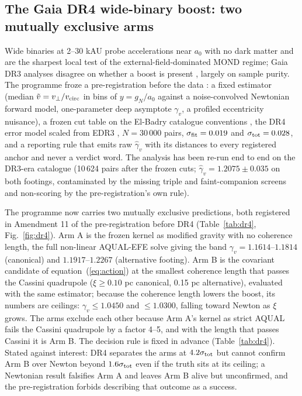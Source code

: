 \documentclass[fleqn,usenatbib]{mnras}
\begin{document}
\subsection{The Gaia DR4 wide-binary boost: two mutually exclusive arms}
\label{sec:dr4}
Wide binaries at 2--30 kAU probe accelerations near $a_0$ with no dark matter and are the sharpest local test of the external-field-dominated MOND regime; Gaia DR3 analyses disagree on whether a boost is present \citep{Chae2023,Banik2024}, largely on sample purity. The programme froze a pre-registration before the data \citep{Zimmerman2026prereg}: a fixed estimator (median $\tilde v=v_\perp/v_{\rm circ}$ in bins of $y=g_N/a_0$ against a noise-convolved Newtonian forward model, one-parameter deep asymptote $\gamma_v$, a profiled eccentricity nuisance), a frozen cut table on the El-Badry catalogue conventions \citep{ElBadry2021}, the DR4 error model scaled from EDR3 \citep{Lindegren2021}, $N=30\,000$ pairs, $\sigma_{\rm fit}=0.019$ and $\sigma_{\rm tot}=0.028$, and a reporting rule that emits raw $\hat\gamma_v$ with its distances to every registered anchor and never a verdict word. The analysis has been re-run end to end on the DR3-era catalogue (10\,624 pairs after the frozen cuts; $\hat\gamma_v=1.2075\pm0.035$ on both footings, contaminated by the missing triple and faint-companion screens and non-scoring by the pre-registration's own rule).

The programme now carries two mutually exclusive predictions, both registered in Amendment 11 of the pre-registration before DR4 (Table~\ref{tab:dr4}, Fig.~\ref{fig:dr4}). Arm A is the frozen kernel as modified gravity with no coherence length, the full non-linear AQUAL-EFE solve giving the band $\gamma_v=1.1614$--$1.1814$ (canonical) and $1.1917$--$1.2267$ (alternative footing). Arm B is the covariant candidate of equation~(\ref{eq:action}) at the smallest coherence length that passes the Cassini quadrupole ($\xi\ge0.10$ pc canonical, 0.15 pc alternative), evaluated with the same estimator; because the coherence length lowers the boost, its numbers are ceilings: $\gamma_v\le1.0450$ and $\le1.0300$, falling toward Newton as $\xi$ grows. The arms exclude each other because Arm A's kernel as strict AQUAL fails the Cassini quadrupole by a factor 4--5, and with the length that passes Cassini it is Arm B. The decision rule is fixed in advance (Table~\ref{tab:dr4}). Stated against interest: DR4 separates the arms at $4.2\sigma_{\rm tot}$ but cannot confirm Arm B over Newton beyond $1.6\sigma_{\rm tot}$ even if the truth sits at its ceiling; a Newtonian result falsifies Arm A and leaves Arm B alive but unconfirmed, and the pre-registration forbids describing that outcome as a success.
\end{document}
